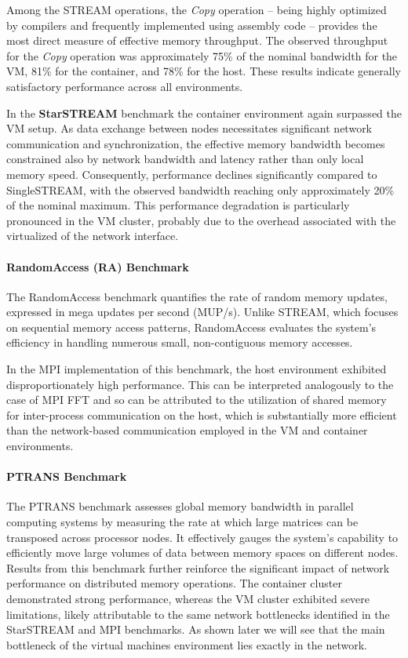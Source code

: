 Among the STREAM operations, the \textit{Copy} operation -- being highly optimized by compilers and frequently implemented using assembly code -- provides the most direct measure of effective memory throughput. The observed throughput for the \textit{Copy} operation was approximately 75\% of the nominal bandwidth for the VM, 81\% for the container, and 78\% for the host. These results indicate generally satisfactory performance across all environments.

In the \textbf{StarSTREAM} benchmark the container environment again surpassed the VM setup. As data exchange between nodes necessitates significant network communication and synchronization, the effective memory bandwidth becomes constrained also by network bandwidth and latency rather than only local memory speed. Consequently, performance declines significantly compared to SingleSTREAM, with the observed bandwidth reaching only approximately 20\% of the nominal maximum. This performance degradation is particularly pronounced in the VM cluster, probably due to the overhead associated with the virtualized of the network interface.

\paragraph{RandomAccess (RA) Benchmark}

The RandomAccess benchmark quantifies the rate of random memory updates, expressed in mega updates per second (MUP/s). Unlike STREAM, which focuses on sequential memory access patterns, RandomAccess evaluates the system's efficiency in handling numerous small, non-contiguous memory accesses. 

In the MPI implementation of this benchmark, the host environment exhibited disproportionately high performance. This can be interpreted analogously to the case of MPI FFT and so can be attributed to the utilization of shared memory for inter-process communication on the host, which is substantially more efficient than the network-based communication employed in the VM and container environments.

\paragraph{PTRANS Benchmark}

The PTRANS benchmark assesses global memory bandwidth in parallel computing systems by measuring the rate at which large matrices can be transposed across processor nodes. It effectively gauges the system's capability to efficiently move large volumes of data between memory spaces on different nodes. Results from this benchmark further reinforce the significant impact of network performance on distributed memory operations. The container cluster demonstrated strong performance, whereas the VM cluster exhibited severe limitations, likely attributable to the same network bottlenecks identified in the StarSTREAM and MPI benchmarks. As shown later we will see that the main bottleneck of the virtual machines environment lies exactly in the network.


